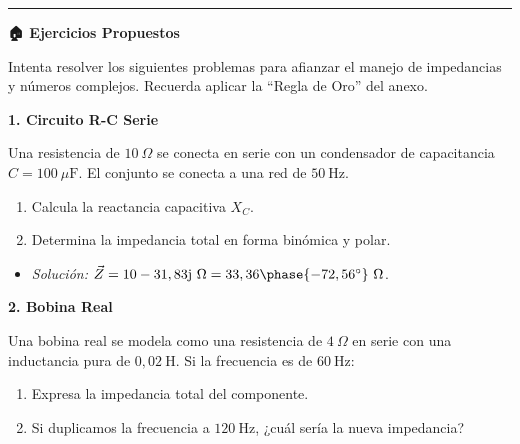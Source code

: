 \documentclass[
  a4paper,
  DIV=11,
  numbers=noendperiod]{scrreprt}
\providecommand{\tightlist}{%
  \setlength{\itemsep}{0pt}\setlength{\parskip}{0pt}}
\begin{document}
\begin{center}\rule{0.5\linewidth}{0.5pt}\end{center}

\begin{tcolorbox}[enhanced jigsaw, breakable, colback=white, left=2mm, leftrule=.75mm, rightrule=.15mm, toprule=.15mm, colframe=quarto-callout-important-color-frame, arc=.35mm, bottomrule=.15mm, opacityback=0]

\vspace{-3mm}\textbf{🏠 Ejercicios Propuestos}\vspace{3mm}

Intenta resolver los siguientes problemas para afianzar el manejo de
impedancias y números complejos. Recuerda aplicar la ``Regla de Oro''
del anexo.

\textbf{1. Circuito R-C Serie}

\vspace{-1em}

Una resistencia de \(10 \ \Omega\) se conecta en serie con un
condensador de capacitancia \(C = 100 \ \mu\text{F}\). El conjunto se
conecta a una red de \(50 \ \text{Hz}\).

\vspace{-1em}

\begin{enumerate}
\def\labelenumi{\alph{enumi})}
\tightlist
\item
  Calcula la reactancia capacitiva \(X_C\).
\item
  Determina la impedancia total en forma binómica y polar.
\end{enumerate}

\begin{itemize}
\tightlist
\item
  \emph{Solución:}
  \(\vec{Z} = 10 - 31,83 \mathrm{j} \ \Omega = 33,36 \phase{-72,56^\circ} \ \Omega\).
\end{itemize}

\textbf{2. Bobina Real}

\vspace{-1em}

Una bobina real se modela como una resistencia de \(4 \ \Omega\) en
serie con una inductancia pura de \(0,02 \ \text{H}\). Si la frecuencia
es de \(60 \ \text{Hz}\):

\vspace{-1em}

\begin{enumerate}
\def\labelenumi{\alph{enumi})}
\tightlist
\item
  Expresa la impedancia total del componente.
\item
  Si duplicamos la frecuencia a \(120 \ \text{Hz}\), ¿cuál sería la
  nueva impedancia?
\end{enumerate}


\end{tcolorbox}
\end{document}
